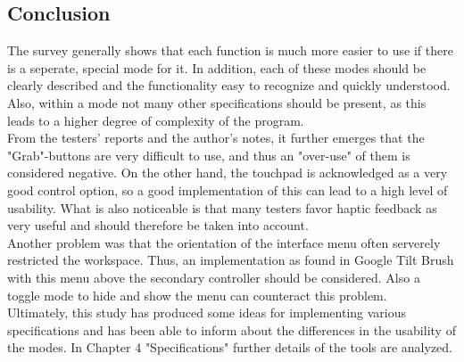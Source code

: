 \documentclass{report}
\begin{document}
		\subsection{Conclusion}
			The survey generally shows that each function is much more easier to use if there is a seperate, special mode for it. In addition, each of these modes should be clearly described and the functionality easy to recognize and quickly understood. Also, within a mode not many other specifications should be present, as this leads to a higher degree of complexity of the program. \\
			From the testers' reports and the author's notes, it further emerges that the "Grab"-buttons are very difficult to use, and thus an "over-use" of them is considered negative. On the other hand, the touchpad is acknowledged as a very good control option, so a good implementation of this can lead to a high level of usability. What is also noticeable is that many testers favor haptic feedback as very useful and should therefore be taken into account. \\
			Another problem was that the orientation of the interface menu often serverely restricted the workspace. Thus, an implementation as found in Google Tilt Brush with this menu above the secondary controller should be considered. Also a toggle mode to hide and show the menu can counteract this problem. \\
			Ultimately, this study has produced some ideas for implementing various specifications and has been able to inform about the differences in the usability of the modes. In Chapter 4 "Specifications" further details of the tools are analyzed.
	
\end{document}
